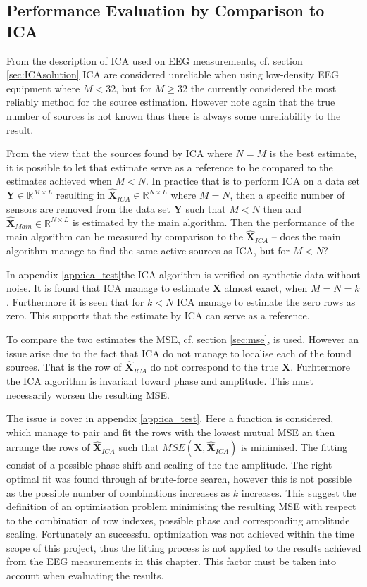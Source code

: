 \subsection{Performance Evaluation by Comparison to ICA}
From the description of ICA used on EEG measurements, cf. section \ref{sec:ICAsolution} ICA are considered unreliable when using low-density EEG equipment where $M<32$, but for $M\geq 32$ the currently considered the most reliably method for the source estimation. However note again that the true number of sources is not known thus there is always some unreliability to the result. 

From the view that the sources found by ICA where $N=M$ is the best estimate, it is possible to let that estimate serve as a reference to be compared to the estimates achieved when $M<N$. 
In practice that is to perform ICA on a data set $\textbf{Y}\in \mathbb{R}^{M \times L}$ resulting in $\hat{\textbf{X}}_{ICA}\in \mathbb{R}^{N\times L}$ where $M=N$, then a specific number of sensors are removed from the data set $\textbf{Y}$ such that $M<N$ then and $\hat{\textbf{X}}_{Main}\in \mathbb{R}^{N\times L}$ is estimated by the main algorithm. Then the performance of the main algorithm can be measured by comparison to the $\hat{\textbf{X}}_{ICA}$ -- does the main algorithm manage to find the same active sources as ICA, but for $M<N$?

In appendix \ref{app:ica_test}the ICA algorithm is verified on synthetic data without noise. It is found that ICA manage to estimate $\textbf{X}$ almost exact, when $M=N=k$. Furthermore it is seen that for $k < N$ ICA manage to estimate the zero rows as zero. This supports that the estimate by ICA can serve as a reference.     

To compare the two estimates the MSE, cf. section \ref{sec:mse}, is used. 
However an issue arise due to the fact that ICA do not manage to localise each of the found sources. That is the row of $\hat{\textbf{X}}_{ICA}$ do not correspond to the true $\textbf{X}$. Furhtermore the ICA algorithm is invariant toward phase and amplitude. This must necessarily worsen the resulting MSE.  

The issue is cover in appendix \ref{app:ica_test}. Here a function is considered, which manage to pair and fit the rows with the lowest mutual MSE an then arrange the rows of $\hat{\textbf{X}}_{ICA}$ such that $MSE(\textbf{X},\hat{\textbf{X}}_{ICA})$ is minimised. The fitting consist of a possible phase shift and scaling of the the amplitude. 
The right optimal fit was found through af brute-force search, however this is not possible as the possible number of combinations increases as $k$ increases. This suggest the definition of an optimisation problem minimising the resulting MSE with respect to the combination of row indexes, possible phase and corresponding amplitude scaling. Fortunately an successful optimization was not achieved within the time scope of this project, thus the fitting process is not applied to the results achieved from the EEG measurements in this chapter. 
This factor must be taken into account when evaluating the results.    

